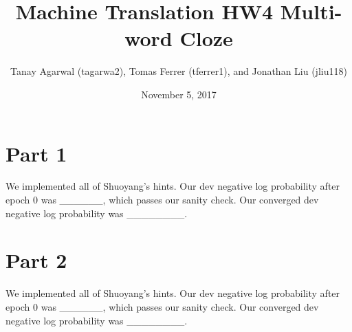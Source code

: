\documentclass{article}
\title{Machine Translation HW4 Multi-word Cloze}
\author{Tanay Agarwal (tagarwa2), Tomas Ferrer (tferrer1), and Jonathan Liu (jliu118)}
\date{November 5, 2017}
\begin{document}
\section{Part 1}

We implemented all of Shuoyang's hints. Our dev negative log probability after epoch 0 was ______, which passes our sanity check. Our converged dev negative log probability was ________.

\section{Part 2}

We implemented all of Shuoyang's hints. Our dev negative log probability after epoch 0 was ______, which passes our sanity check. Our converged dev negative log probability was ________.

\maketitle
\end{document}
